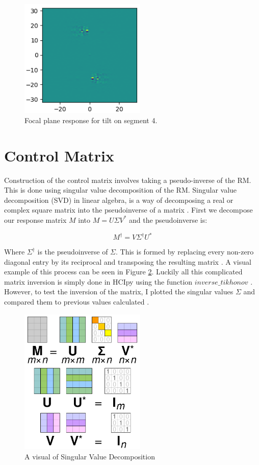 \begin{figure}[H]
    \centering
    \includegraphics[width = 6cm]{Figures/I_diff.png}
    \caption{Focal plane response for tilt on segment 4.}
    \label{fig:I_diff}
\end{figure}



\section{Control Matrix}

Construction of the control matrix involves taking a pseudo-inverse of the RM.  This is done using singular value
decomposition of the RM.  Singular value decomposition (SVD) in linear algebra, is a way of decomposing a real or
complex square matrix into the pseudoinverse of a matrix \cite{Hestenes1958InversionResults}.  First we decompose
our response matrix $M$ into $M = U \Sigma V^{\ast}$ and the pseudoinverse is:

\begin{equation}
    M^{\dagger} = V \Sigma^{\dagger} U^{\ast}
\end{equation}

Where $\Sigma^{\dagger}$ is the pseudoinverse of $\Sigma$.  This is formed by replacing every non-zero diagonal entry by
its reciprocal and transposing the resulting matrix \cite{Hestenes1958InversionResults}.  A visual example of this
process can be seen in Figure \ref{fig:SVD}. Luckily all this complicated matrix inversion is simply done in HCIpy using
the function $inverse\_tikhonov$ \cite{por2018hcipy}.  However, to test the inversion of the matrix, I plotted the
singular values $\Sigma$ and compared them to previous values calculated .

\begin{figure}[H]
    \centering
    \includegraphics[width = 6cm]{Figures/Singular_value_decomposition_visualisation.jpg}
    \caption{A visual of Singular Value Decomposition}
    \label{fig:SVD}
\end{figure}



